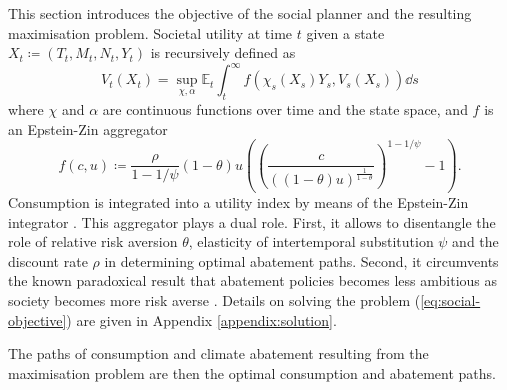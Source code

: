 \documentclass[../../main.tex]{subfiles}
\begin{document}
This section introduces the objective of the social planner and the resulting maximisation problem. Societal utility at time $t$ given a state $X_t \coloneqq (T_t, M_t, N_t, Y_t)$ is recursively defined as \begin{equation} \label{eq:social-objective}
    V_t(X_t) = \sup_{\chi, \alpha} \mathbb{E}_t 
    \int_{t}^{\infty} f(\chi_s(X_s) Y_s, V_s(X_s)) \dd{s}
\end{equation} where $\chi$ and $\alpha$ are continuous functions over time and the state space, and $f$ is an Epstein-Zin aggregator \begin{equation} \label{eq:aggregator}
    f(c, u) \coloneqq \frac{\rho}{1 - 1 / \psi} (1 - \theta) u  \left( \left(\frac{c}{((1 - \theta) u)^{\frac{1}{1 - \theta}}}\right)^{1 - 1 / \psi} - 1 \right).
\end{equation} Consumption is integrated into a utility index by means of the Epstein-Zin integrator \citep{duffie_asset_1992}. This aggregator plays a dual role. First, it allows to disentangle the role of relative risk aversion $\theta$, elasticity of intertemporal substitution $\psi$ and the discount rate $\rho$ in determining optimal abatement paths. Second, it circumvents the known paradoxical result that abatement policies becomes less ambitious as society becomes more risk averse \citep{pindyck_economic_2013}. Details on solving the problem (\ref{eq:social-objective}) are given in Appendix \ref{appendix:solution}. 

The paths of consumption and climate abatement resulting from the maximisation problem are then the optimal consumption and abatement paths. 
\end{document}
